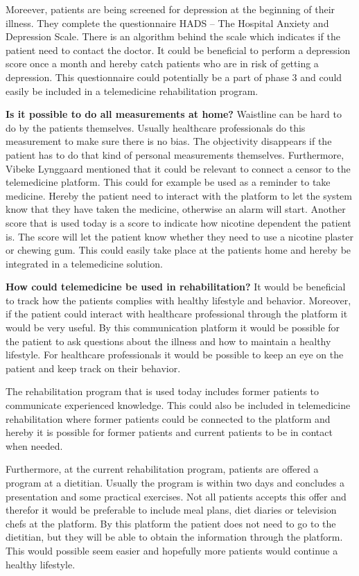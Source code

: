 Moreever, patients are being screened for depression at the beginning of their illness. They complete the questionnaire HADS – The Hospital Anxiety and Depression Scale. There is an algorithm behind the scale which indicates if the patient need to contact the doctor. It could be beneficial to perform a depression score once a month and hereby catch patients who are in risk of getting a depression. This questionnaire could potentially be a part of phase 3 and could easily be included in a telemedicine rehabilitation program. 

\textbf{Is it possible to do all measurements at home?} \newline 
Waistline can be hard to do by the patients themselves. Usually healthcare professionals do this measurement to make sure there is no bias. The objectivity disappears if the patient has to do that kind of personal measurements themselves. Furthermore, Vibeke Lynggaard mentioned that it could be relevant to connect a censor to the telemedicine platform. This could for example be used as a reminder to take medicine. Hereby the patient need to interact with the platform to let the system know that they have taken the medicine, otherwise an alarm will start. Another score that is used today is a score to indicate how nicotine dependent the patient is. The score will let the patient know whether they need to use a nicotine plaster or chewing gum. This could easily take place at the patients home and hereby be integrated in a telemedicine solution. 

\textbf{How could telemedicine be used in rehabilitation?} \newline 
It would be beneficial to track how the patients complies with healthy lifestyle and behavior. Moreover, if the patient could interact with healthcare professional through the platform it would be very useful. By this communication platform it would be possible for the patient to ask questions about the illness and how to maintain a healthy lifestyle. For healthcare professionals it would be possible to keep an eye on the patient and keep track on their behavior. 

The rehabilitation program that is used today includes former patients to communicate experienced knowledge. This could also be included in telemedicine rehabilitation where former patients could be connected to the platform and hereby it is possible for former patients and current patients to be in contact when needed.   

Furthermore, at the current rehabilitation program, patients are offered a program at a dietitian. Usually the program is within two days and concludes a presentation and some practical exercises. Not all patients accepts this offer and therefor it would be preferable to include meal plans, diet diaries or television chefs at the platform. By this platform the patient does not need to go to the dietitian, but they will be able to obtain the information through the platform. This would possible seem easier and hopefully more patients would continue a healthy lifestyle. 

